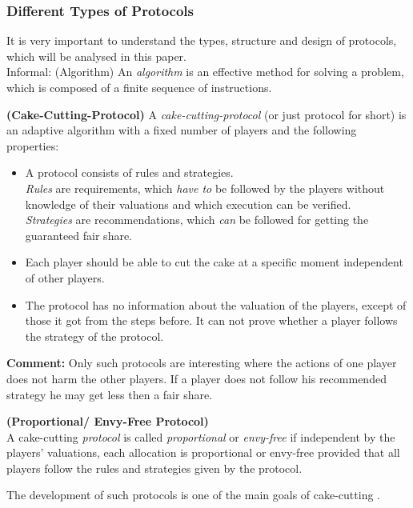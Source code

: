 \subsubsection{Different Types of Protocols}
It is very important to understand the types, structure and design of protocols, which will be analysed in this paper.\\
\newline
Informal: (Algorithm)
\newline An \emph{algorithm} is an effective method for solving a problem, which is composed of a finite sequence of instructions.
\begin{defi}{\textbf{(Cake-Cutting-Protocol)}}
\newline A \emph{cake-cutting-protocol} (or just protocol for short) is an adaptive algorithm with a fixed number of players and the following properties:
\begin{itemize}
\item{A protocol consists of rules and strategies.\\ \emph{Rules} are requirements, which \emph{have to} be followed by the players without knowledge of their valuations and which execution can be verified.\\
\emph{Strategies} are recommendations, which \emph{can} be followed for getting the guaranteed fair share.}
\item Each player should be able to cut the cake at a specific moment independent of other players.
\item The protocol has no information about the valuation of the players, except of those it got from the steps before. It can not prove whether a player follows the strategy of the protocol.
\end{itemize}
\end{defi}
\textbf{Comment:} Only such protocols are interesting where the actions of one player does not harm the other players. If a player does not follow his recommended strategy he may get less then a fair share.
\begin{defi}{\textbf{(Proportional/ Envy-Free Protocol)}}\\
A cake-cutting \emph{protocol} is called \emph{proportional} or \emph{envy-free} if independent by the players' valuations, each allocation is proportional or envy-free provided that all players follow the rules and strategies given by the protocol.
\end{defi}
The development of such protocols is one of the main goals of cake-cutting \cite{bla}.

